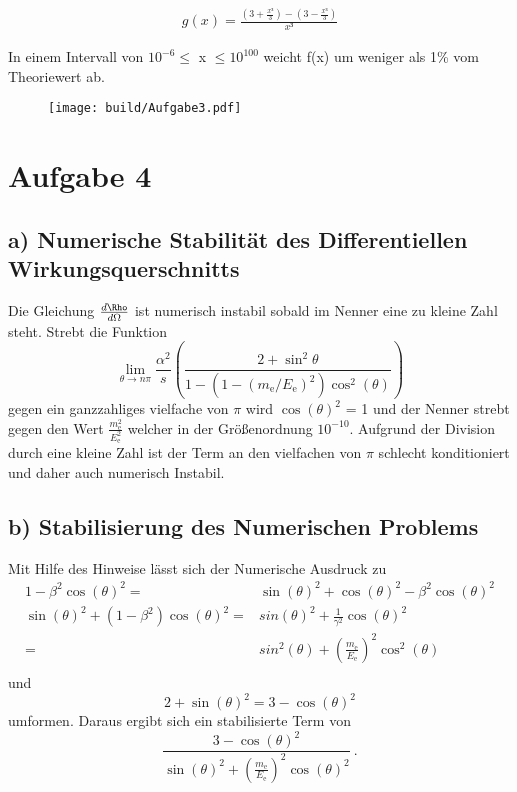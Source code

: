 \begin{align*}
	g(x) = \frac{(3 + \frac{x³}{3}) - (3 - \frac{x³}{3})}{x³}
\end{align*}

In einem Intervall von $10^{-6} \le$ x $\le 10^{100}$ weicht f(x) um weniger als 1\% vom Theoriewert ab. \\

\begin{figure}
	\centering
	\texttt{[image: build/Aufgabe3.pdf]}
\end{figure}
\section*{Aufgabe 4}
\subsection*{a) Numerische Stabilität des Differentiellen Wirkungsquerschnitts}
Die Gleichung $\frac{d\Rho}{d\Omega}$ ist numerisch instabil sobald im Nenner eine zu kleine Zahl steht. Strebt die Funktion 
\begin{equation}
  \lim\limits_{\theta \to n\pi} \frac{\alpha^2}{s} \left( \frac{2+\sin^2{\theta}}{1-(1-(m_\text{e}/E_\text{e})^2) \cos^2(\theta)} \right)
  \label{eqn:wirk}
\end{equation}
gegen ein ganzzahliges vielfache von $\pi$ wird $\cos(\theta)^2$ =  1 und der Nenner strebt gegen den Wert $\frac{m_\text{e}^2}{E_\text{e}^2}$ welcher in der Größenordnung $10^{-10}$. Aufgrund der Division durch eine kleine Zahl ist der Term an den vielfachen von $\pi$ schlecht konditioniert und daher auch numerisch Instabil.
\subsection*{b) Stabilisierung des Numerischen Problems}
Mit Hilfe des Hinweise lässt sich der Numerische Ausdruck zu 
\begin{eqnarray}
  1 -\beta^2 \cos(\theta)^2 =& \sin(\theta)^2 + \cos(\theta)^2 -\beta^2 \cos(\theta)^2 \\
  \sin(\theta)^2 + (1 - \beta^2) \cos(\theta)^2 =& sin(\theta)^2 + \frac{1}{\gamma^2} \cos(\theta)^2 \\
 =& sin^2(\theta) + \left( \frac{m_\text{e}}{E_\text{e}} \right)^2 \cos^2(\theta) \\
  \label{}
\end{eqnarray}
und
\begin{equation}
  2+\sin(\theta)^2 = 3 - \cos(\theta)^2
  \label{<++>}
\end{equation}
umformen. Daraus ergibt sich ein stabilisierte Term von 
\begin{equation}
  \frac{3 - \cos(\theta)^2}{\sin(\theta)^2 + (\frac{m_\text{e}}{E_\text{e}})^2 \cos(\theta)^2} \ .
  \label{}
\end{equation}
